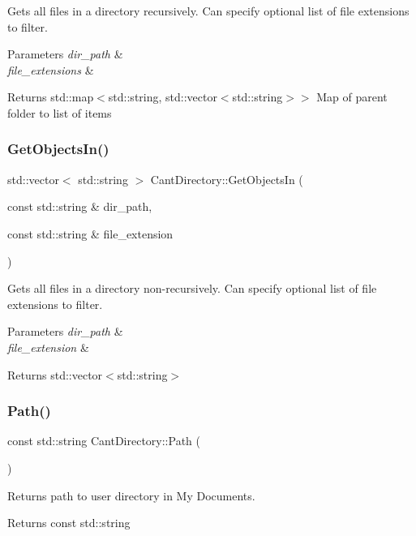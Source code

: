 Gets all files in a directory recursively. Can specify optional list of file extensions to filter. 


\begin{DoxyParams}{Parameters}
{\em dir\+\_\+path} & \\
\hline
{\em file\+\_\+extensions} & \\
\hline
\end{DoxyParams}
\begin{DoxyReturn}{Returns}
std\+::map$<$std\+::string, std\+::vector$<$std\+::string$>$$>$ Map of parent folder to list of items 
\end{DoxyReturn}
\mbox{\label{namespaceCantDirectory_a6b53cda775608f26f9798c40b81f13ef}} 
\subsubsection{\texorpdfstring{Get\+Objects\+In()}{GetObjectsIn()}}
{\footnotesize\ttfamily std\+::vector$<$ std\+::string $>$ Cant\+Directory\+::\+Get\+Objects\+In (\begin{DoxyParamCaption}\item[{const std\+::string \&}]{dir\+\_\+path,  }\item[{const std\+::string \&}]{file\+\_\+extension }\end{DoxyParamCaption})}



Gets all files in a directory non-\/recursively. Can specify optional list of file extensions to filter. 


\begin{DoxyParams}{Parameters}
{\em dir\+\_\+path} & \\
\hline
{\em file\+\_\+extension} & \\
\hline
\end{DoxyParams}
\begin{DoxyReturn}{Returns}
std\+::vector$<$std\+::string$>$ 
\end{DoxyReturn}
\mbox{\label{namespaceCantDirectory_aada0c40e37a1b59290f3558e3afb4af0}} 
\subsubsection{\texorpdfstring{Path()}{Path()}}
{\footnotesize\ttfamily const std\+::string Cant\+Directory\+::\+Path (\begin{DoxyParamCaption}{ }\end{DoxyParamCaption})}



Returns path to user directory in My Documents. 

\begin{DoxyReturn}{Returns}
const std\+::string 
\end{DoxyReturn}
